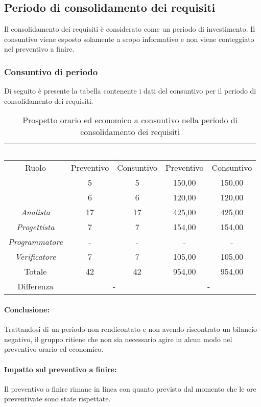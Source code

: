 \subsection{Periodo di consolidamento dei requisiti}
Il consolidamento dei requisiti è considerato come un periodo di investimento. Il consuntivo viene esposto solamente a scopo informativo e non viene conteggiato nel preventivo a finire.
\subsubsection{Consuntivo di periodo}
Di seguito è presente la tabella contenente i dati del consuntivo per il periodo di consolidamento dei requisiti.
\begin{table}[H]
	\centering
	\begin{tabular}{|c|c|c|c|c|}
		\rowcolor{darkblue} 
		&\multicolumn{2}{c|}{\textcolor{white}{Ore}}&\multicolumn{2}{c|}{\textcolor{white}{Costo in €}}\\ \hline
		Ruolo			&	Preventivo				&	Consuntivo		&	Preventivo	&	Consuntivo\\ \hline
		{\Responsabile}		&	5					&	5				&	150,00		&	150,00 \\ \hline
		{\Amministratore}	&	6					&	6				&	120,00		&	120,00 \\ \hline
		\textit{Analista}	&	17					&	17				&	425,00		&	425,00 \\ \hline
		\textit{Progettista}& 	7					&	7 				& 	154,00		&  	154,00 \\ \hline
		\textit{Programmatore}& -					& 	-				& 	-			&  	- \\ \hline
		\textit{Verificatore}&	7					&	7				&	105,00		&	105,00 \\ \hline
		Totale				&	42					&	42				&	954,00		&	954,00 \\ \hline
		Differenza			& 	\multicolumn{2}{c|}{-} 			&\multicolumn{2}{c|}{-}\\ \hline
	\end{tabular}
	\caption{Prospetto orario ed economico a consuntivo nella periodo di consolidamento dei requisiti}
\end{table}
\paragraph*{Conclusione:}
Trattandosi di un periodo non rendicontato e non avendo riscontrato un bilancio negativo, il gruppo {\Gruppo} ritiene che non sia necessario agire in alcun modo nel preventivo orario ed economico.
\paragraph*{Impatto sul preventivo a finire:}
Il preventivo a finire rimane in linea con quanto previsto dal momento che le ore preventivate sono state rispettate.